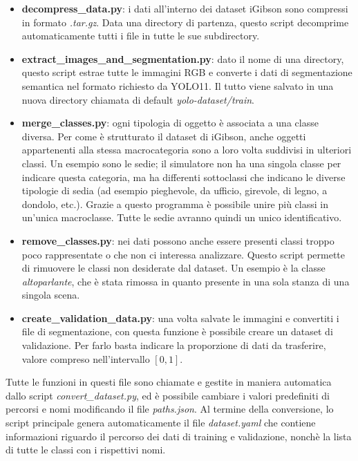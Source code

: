 \documentclass[12pt]{report}
\begin{document}
\begin{itemize}
	\item \textbf{decompress\_data.py}: i dati all'interno dei dataset iGibson sono compressi in formato \textit{.tar.gz}. Data una directory di partenza, questo script decomprime automaticamente tutti i file in tutte le sue subdirectory.
	
	\item \textbf{extract\_images\_and\_segmentation.py}: dato il nome di una directory, questo script estrae tutte le immagini RGB e converte i dati di segmentazione semantica nel formato richiesto da YOLO11. Il tutto viene salvato in una nuova directory chiamata di default \textit{yolo-dataset/train}.
	
	\item \textbf{merge\_classes.py}: ogni tipologia di oggetto è associata a una classe diversa. Per come è strutturato il dataset di iGibson, anche oggetti appartenenti alla stessa macrocategoria sono a loro volta suddivisi in ulteriori classi. Un esempio sono le sedie; il simulatore non ha una singola classe per indicare questa categoria, ma ha differenti sottoclassi che indicano le diverse tipologie di sedia (ad esempio pieghevole, da ufficio, girevole, di legno, a dondolo, etc.). Grazie a questo programma è possibile unire più classi in un'unica macroclasse. Tutte le sedie avranno quindi un unico identificativo.
	
	\item \textbf{remove\_classes.py}: nei dati possono anche essere presenti classi troppo poco rappresentate o che non ci interessa analizzare. Questo script permette di rimuovere le classi non desiderate dal dataset. Un esempio è la classe \textit{altoparlante}, che è stata rimossa in quanto presente in una sola stanza di una singola scena.
	
	\item \textbf{create\_validation\_data.py}: una volta salvate le immagini e convertiti i file di segmentazione, con questa funzione è possibile creare un dataset di validazione. Per farlo basta indicare la proporzione di dati da trasferire, valore compreso nell'intervallo $[0, 1]$.
\end{itemize}

Tutte le funzioni in questi file sono chiamate e gestite in maniera automatica dallo script \textit{convert\_dataset.py}, ed è possibile cambiare i valori predefiniti di percorsi e nomi modificando il file \textit{paths.json}. Al termine della conversione, lo script principale genera automaticamente il file \textit{dataset.yaml} che contiene informazioni riguardo il percorso dei dati di training e validazione, nonchè la lista di tutte le classi con i rispettivi nomi.
\end{document}
